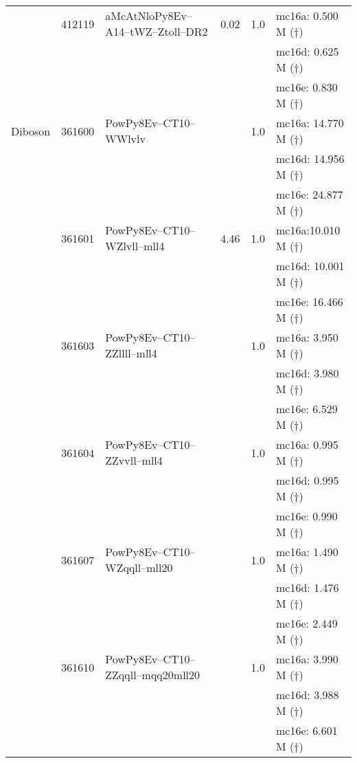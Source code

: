 \begin{center}
{\begin{xtabular}{lclS[round-mode=figures, round-precision=3]S[round-mode=places,  round-precision=2]l}
			\midrule
			\tWZ   & 412119 &  aMcAtNloPy8Ev--A14--tWZ--Ztoll--DR2     & 0.02    & 1.0   & mc16a: 0.500 M ($\dagger$)  \\
			& & & & & mc16d: 0.625 M ($\dagger$) \\
			& & & & & mc16e: 0.830 M ($\dagger$) \\
			
			\midrule
			Diboson & 361600 & PowPy8Ev--CT10--WWlvlv             &      & 1.0 & mc16a: 14.770 M ($\dagger$) \\
			& & & & & mc16d: 14.956 M ($\dagger$) \\
			& & & & & mc16e: 24.877 M ($\dagger$) \\
			& 361601 & PowPy8Ev--CT10--WZlvll--mll4    & 4.46      & 1.0 & mc16a:10.010 M ($\dagger$) \\
			& & & & & mc16d: 10.001 M ($\dagger$) \\
			& & & & & mc16e: 16.466 M ($\dagger$) \\
			& 361603 & PowPy8Ev--CT10--ZZllll--mll4    &     & 1.0 & mc16a: 3.950 M ($\dagger$) \\
			& & & & & mc16d: 3.980 M ($\dagger$) \\
			& & & & & mc16e: 6.529 M ($\dagger$) \\
			& 361604 & PowPy8Ev--CT10--ZZvvll--mll4    &     & 1.0 & mc16a: 0.995 M ($\dagger$) \\
			& & & & & mc16d: 0.995 M ($\dagger$) \\
			& & & & & mc16e: 0.990 M ($\dagger$) \\
			& 361607 & PowPy8Ev--CT10--WZqqll--mll20    &     & 1.0 & mc16a: 1.490 M ($\dagger$) \\
			& & & & & mc16d: 1.476 M ($\dagger$) \\
			& & & & & mc16e: 2.449 M ($\dagger$) \\
			& 361610 & PowPy8Ev--CT10--ZZqqll--mqq20mll20    &     & 1.0 & mc16a: 3.990 M ($\dagger$) \\
			& & & & & mc16d: 3.988 M ($\dagger$) \\
			& & & & & mc16e: 6.601 M ($\dagger$) \\
			
			
		\end{xtabular}
}\end{center}
